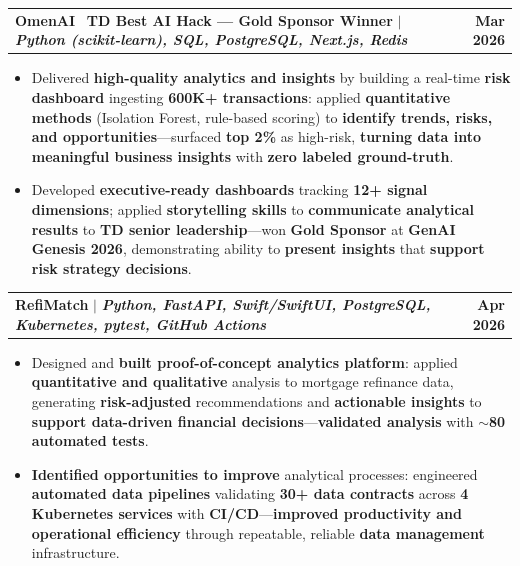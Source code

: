\documentclass[letterpaper,10pt]{article}
\makeatletter
\newcommand{\resumeItem}[1]{
  \item\small{
    {#1 \vspace{-1pt}}
  }
}
\newcommand{\resumeProjectHeading}[2]{
    \item
    \begin{tabular*}{1.001\textwidth}{l@{\extracolsep{\fill}}r}
      \small#1 & \textbf{\small #2}\\
    \end{tabular*}\vspace{-9pt}
}
\newcommand{\resumeItemListStart}{\begin{itemize}[leftmargin=0.15in]}
\newcommand{\resumeItemListEnd}{\end{itemize}\vspace{-4pt}}
\makeatother
\begin{document}
    \resumeProjectHeading
          {\textbf{OmenAI} \textbar\ \textbf{TD Best AI Hack --- Gold Sponsor Winner} $|$ \emph{\textbf{Python (scikit-learn), SQL, PostgreSQL, Next.js, Redis}}}{Mar 2026}
    \resumeItemListStart
        \resumeItem{Delivered \textbf{high-quality analytics and insights} by building a real-time \textbf{risk dashboard} ingesting \textbf{600K+ transactions}: applied \textbf{quantitative methods} (Isolation Forest, rule-based scoring) to \textbf{identify trends, risks, and opportunities}---surfaced \textbf{top 2\%} as high-risk, \textbf{turning data into meaningful business insights} with \textbf{zero labeled ground-truth}.}
        \vspace{-2pt}
        \resumeItem{Developed \textbf{executive-ready dashboards} tracking \textbf{12+ signal dimensions}; applied \textbf{storytelling skills} to \textbf{communicate analytical results} to \textbf{TD senior leadership}---won \textbf{Gold Sponsor} at \textbf{GenAI Genesis 2026}, demonstrating ability to \textbf{present insights} that \textbf{support risk strategy decisions}.}
    \resumeItemListEnd
    \vspace{-18pt}

    \resumeProjectHeading
          {\textbf{RefiMatch} $|$ \emph{\textbf{Python, FastAPI, Swift/SwiftUI, PostgreSQL, Kubernetes, pytest, GitHub Actions}}}{Apr 2026}
          \resumeItemListStart
            \resumeItem{Designed and \textbf{built proof-of-concept analytics platform}: applied \textbf{quantitative and qualitative} analysis to mortgage refinance data, generating \textbf{risk-adjusted} recommendations and \textbf{actionable insights} to \textbf{support data-driven financial decisions}---\textbf{validated analysis} with \textbf{$\sim$80 automated tests}.}
            \vspace{-2pt}
            \resumeItem{\textbf{Identified opportunities to improve} analytical processes: engineered \textbf{automated data pipelines} validating \textbf{30+ data contracts} across \textbf{4 Kubernetes services} with \textbf{CI/CD}---\textbf{improved productivity and operational efficiency} through repeatable, reliable \textbf{data management} infrastructure.}
          \resumeItemListEnd
    \vspace{-18pt}
\end{document}
